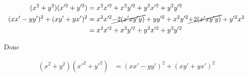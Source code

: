 \documentclass{article}
\begin{document}
\subsection{}

\begin{align*}
	(x^2+y^2)(x'^2+y'^2)&= x^2x'^2+x^2y'^2+y^2x'^2+y^2y'^2 \\
	(x x' - yy')^2+(xy'+yx')^2 &= x^2x'^2\cancel{-2(x'xy'y)}+yy'^2+x^2y'^2\cancel{+2(x'xy'y)}+y'^2x^2 \\
	&= x^2x'^2+x^2y'^2+y^2x'^2+y^2y'^2 \\
\end{align*}

Donc

\begin{align*}
	(x^2+y^2)(x'^2+y'^2)&=(x x' - yy')^2+(xy'+yx')^2
\end{align*}

\subsection{}



\end{document}
